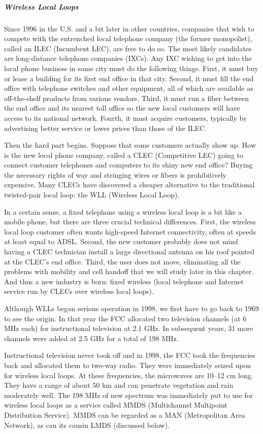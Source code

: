 \documentclass[b5paper,11pt]{memoir}
\begin{document}
\subparagraph{Wireless Local Loops}

Since 1996 in the U.S. and a bit later in other countries, companies
that wish to compete with the entrenched local telephone company (the
former monopolist), called an {ILEC} ({Incumbent LEC}), are free to do
so. The most likely candidates are long-distance telephone companies
(IXCs). Any IXC wishing to get into the local phone business in some
city must do the following things. First, it must buy or lease a
building for its first end office in that city. Second, it must fill the
end office with telephone switches and other equipment, all of which are
available as off-the-shelf products from various vendors. Third, it must
run a fiber between the end office and its nearest toll office so the
new local customers will have access to its national network. Fourth, it
must acquire customers, typically by advertising better service or lower
prices than those of the ILEC.

Then the hard part begins. Suppose that some customers actually show up.
How is the new local phone company, called a {CLEC} ({Competitive LEC})
going to connect customer telephones and computers to its shiny new end
office? Buying the necessary rights of way and stringing wires or fibers
is prohibitively expensive. Many CLECs have discovered a cheaper
alternative to the traditional twisted-pair local loop: the {WLL}
({Wireless Local Loop}).

In a certain sense, a fixed telephone using a wireless local loop is a
bit like a mobile phone, but there are three crucial technical
differences. First, the wireless local loop customer often wants
high-speed Internet connectivity, often at speeds at least equal to
ADSL. Second, the new customer probably does not mind having a CLEC
technician install a large directional antenna on his roof pointed at
the CLEC's end office. Third, the user does not move, eliminating all
the problems with mobility and cell handoff that we will study later in
this chapter. And thus a new industry is born: {fixed wireless} (local
telephone and Internet service run by CLECs over wireless local loops).

Although WLLs began serious operation in 1998, we first have to go back
to 1969 to see the origin. In that year the FCC allocated two television
channels (at 6 MHz each) for instructional television at 2.1 GHz. In
subsequent years, 31 more channels were added at 2.5 GHz for a total of
198 MHz.

Instructional television never took off and in 1998, the FCC took the
frequencies back and allocated them to two-way radio. They were
immediately seized upon for wireless local loops. At these frequencies,
the microwaves are 10--12 cm long. They have a range of about 50 km and
can penetrate vegetation and rain moderately well. The 198 MHz of new
spectrum was immediately put to use for wireless local loops as a
service called {MMDS} ({Multichannel Multipoint Distribution Service}).
MMDS can be regarded as a MAN (Metropolitan Area Network), as can its
cousin LMDS (discussed below).
\end{document}

